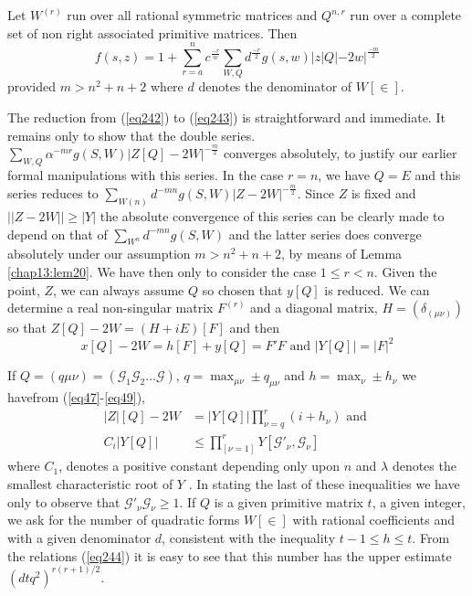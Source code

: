 \begin{lem}\label{chap13:lem23} %
 Let $W^{(r)}$ run over all rational symmetric matrices and $Q ^{
    n, r}$ run over a complete set of non right associated primitive
  matrices. Then  
\begin{equation*}
f (s, z) = 1 + \sum^{n}_{r = a} c^{\frac{-r}{w}} \sum_{W, Q}
d^{\frac{-r}{2}} g (s, w)|z|Q|- 2w|^{\frac{-m}{2}}\tag{243}\label{eq243}  
\end{equation*}
 provided $ m > n^2 + n + 2 $ where $d$ denotes the denominator of
  $W[\in]$. 
\end{lem}

The reduction from (\ref{eq242}) to (\ref{eq243}) is straightforward and
immediate. It remains only to show that the double series. $
\sum\limits_{W, Q} \alpha ^{ -m r} g (S,W) |Z[Q] - 2
W|^{-\frac{m}{2}}$ converges absolutely, to justify our 
earlier formal manipulations with this series. In the case $r = n$, we
have $Q = E$ and this series reduces to $\sum\limits_{W{(n)}} d^{-mn}
g (S, W) | Z - 2 W|^{-\frac{m}{2}}$. Since $Z$ is fixed and $||Z -
2W|| \geq |Y|$ the absolute convergence of this series
can be clearly made to depend on that of $\sum\limits_{W^{n}}d^{-mn} g
(S, W)$ and the latter series does converge absolutely under our
assumption $m > n^2 + n + 2$, by means of Lemma \ref{chap13:lem20}. We
have then 
only to consider the case $1 \leq r < n$. Given the point, $Z$, we
can always assume $Q$ so chosen that $y [Q]$ is reduced. We can
determine a real non-singular matrix $F^{(r)}$ and a diagonal matrix, $H
=(\delta _(\mu \nu)) $ so that $Z [Q] - 2W =(H + i E) [F]$ and then 
\begin{equation*}
x[Q] - 2W =h [F]+ y[Q] = F'F \text{  and  } |Y [Q]| = |F|^2
\tag{244}\label{eq244}  
\end{equation*}

If $Q =(q\mu \nu) =(\mathscr{G}_1 \mathscr{G}_2 \ldots \mathscr{G})$,
$q = \max_{ \mu \nu } \pm q_{\mu \nu}$ and $h = \max_ \nu \pm h_\nu$
we have\pageoriginale from (\ref{eq47}-\ref{eq49}),  
\begin{align*}
|Z|[Q] - 2W & = |Y [Q]|\prod^r_{ \nu = q}( i + h_\nu) \text{ and }\\ 
C_i |Y [Q] |& \leq \prod_[\nu = 1] ^{r} Y [ \mathscr{G'}_\nu
  ,\mathscr{G}_\nu] \tag{245}\label{eq245}  
\end{align*}
where $C_1$, denotes a positive constant depending only upon $n$ and
$\lambda$ denotes the smallest characteristic root of $Y$ . In stating
the last of these inequalities we have only to observe that
$\mathscr{G'}_\nu \mathscr{G}_\nu \geq 1$. If $Q$ is a given primitive
matrix $t$, a given integer, we ask for the number of
quadratic forms $W[\in]$ with rational coefficients and with
a given denominator $d$, consistent with the inequality $t - 1 \leq h
\leq t$. From the relations (\ref{eq244}) it is easy to see that this number
has the upper estimate $(d t q ^2 )^ {r (r +1 )/2}$.  

